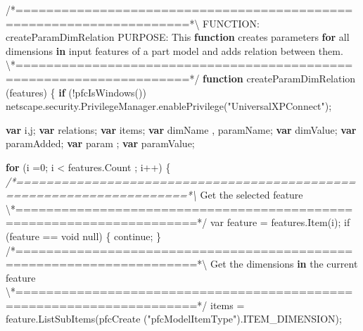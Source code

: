 \documentclass[]{article}
\newenvironment{Shaded}{}{}
\newcommand{\KeywordTok}[1]{\textcolor[rgb]{0.00,0.44,0.13}{\textbf{{#1}}}}
\newcommand{\DataTypeTok}[1]{\textcolor[rgb]{0.56,0.13,0.00}{{#1}}}
\newcommand{\DecValTok}[1]{\textcolor[rgb]{0.25,0.63,0.44}{{#1}}}
\newcommand{\FloatTok}[1]{\textcolor[rgb]{0.25,0.63,0.44}{{#1}}}
\newcommand{\StringTok}[1]{\textcolor[rgb]{0.25,0.44,0.63}{{#1}}}
\newcommand{\CommentTok}[1]{\textcolor[rgb]{0.38,0.63,0.69}{\textit{{#1}}}}
\newcommand{\OtherTok}[1]{\textcolor[rgb]{0.00,0.44,0.13}{{#1}}}
\newcommand{\FunctionTok}[1]{\textcolor[rgb]{0.02,0.16,0.49}{{#1}}}
\newcommand{\NormalTok}[1]{{#1}}
\begin{document}
\begin{Shaded}
\begin{Highlighting}[]
\OtherTok{/}\NormalTok{*====================================================================*\textbackslash{}}
\DataTypeTok{FUNCTION}\NormalTok{: createParamDimRelation}
\DataTypeTok{PURPOSE}\NormalTok{:  This }\KeywordTok{function} \NormalTok{creates parameters }\KeywordTok{for} \NormalTok{all dimensions }\KeywordTok{in} \NormalTok{input }
          \NormalTok{features of a part model and adds relation between }\OtherTok{them}\NormalTok{.}
\NormalTok{\textbackslash{}*====================================================================*}\OtherTok{/}
\KeywordTok{function} \FunctionTok{createParamDimRelation} \NormalTok{(features)}
\NormalTok{\{}
  \KeywordTok{if} \NormalTok{(!}\FunctionTok{pfcIsWindows}\NormalTok{())}
    \OtherTok{netscape}\NormalTok{.}\OtherTok{security}\NormalTok{.}\OtherTok{PrivilegeManager}\NormalTok{.}\FunctionTok{enablePrivilege}\NormalTok{(}\StringTok{"UniversalXPConnect"}\NormalTok{);}
    
  \KeywordTok{var} \NormalTok{i,j;}
  \KeywordTok{var} \NormalTok{relations;}
  \KeywordTok{var} \NormalTok{items;  }
  \KeywordTok{var} \NormalTok{dimName , paramName;}
  \KeywordTok{var} \NormalTok{dimValue;}
  \KeywordTok{var} \NormalTok{paramAdded;}
  \KeywordTok{var} \NormalTok{param ;}
  \KeywordTok{var} \NormalTok{paramValue;}
                   
  \KeywordTok{for} \NormalTok{(i =}\DecValTok{0}\NormalTok{; i < }\OtherTok{features}\NormalTok{.}\FunctionTok{Count} \NormalTok{; i++)}
  \NormalTok{\{   }
      \CommentTok{/*=====================================================================*\textbackslash{}}
        \NormalTok{Get the selected feature}
      \NormalTok{\textbackslash{}*=====================================================================*}\OtherTok{/   }
\OtherTok{      var feature = features.Item}\FloatTok{(}\OtherTok{i}\FloatTok{)}\OtherTok{;}
\OtherTok{      if }\FloatTok{(}\OtherTok{feature == void null}\FloatTok{)}
\OtherTok{      \{}
\OtherTok{          continue;}
\OtherTok{      \}}
\OtherTok{      }
\OtherTok{      /}\NormalTok{*=====================================================================*\textbackslash{}}
        \NormalTok{Get the dimensions }\KeywordTok{in} \NormalTok{the current feature}
      \NormalTok{\textbackslash{}*=====================================================================*}\OtherTok{/}
      \NormalTok{items = }\OtherTok{feature}\NormalTok{.}\FunctionTok{ListSubItems}\NormalTok{(}\FunctionTok{pfcCreate} \NormalTok{(}\StringTok{"pfcModelItemType"}\NormalTok{).}\FunctionTok{ITEM_DIMENSION}\NormalTok{);}


\end{Highlighting}
\end{Shaded}
\end{document}
